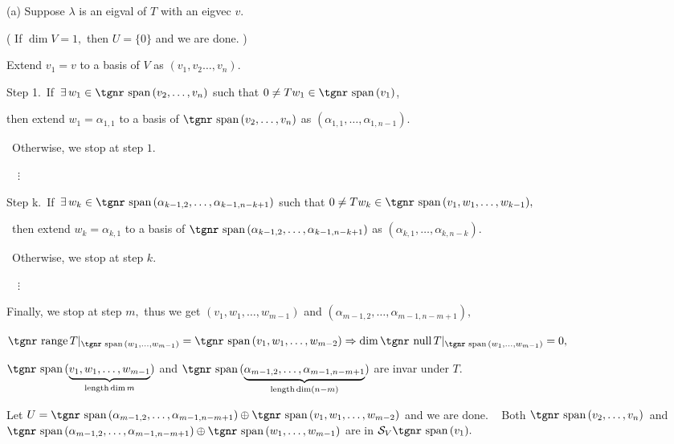 \documentclass[a4paper, 11pt, UTF8]{article}
\def\range{{\textup{\tgnr range}}\,}
\def\null{{\textup{\tgnr null}}\,}
\def\Spn{{\textup{\tgnr span}}\,}
\def\Ha{{\large\Blind{(a) }}}
\begin{document}
\begin{large}
(a) Suppose $\lambda$ is an eigval of $T$ with an eigvec $v.$\par\quad\Ha
( If $\dim V=1,$ then $U=\{0\}$ and we are done. )\par\quad\Ha
Extend $v_1=v$ to a basis of $V$ as $(v_1,v_2\dots,v_n).$\par\quad\Ha
{\tgbfx Step 1.} $\,$If $\,\exists\,w_1\in\Spn(v_2,\dots,v_n)$ such that $0\neq Tw_1\in\Spn(v_1)$,\par\qquad\Ha\qquad
then extend $w_1=\alpha_{1,1}$ to a basis of $\Spn(v_2,\dots,v_n)$ as $(\alpha_{1,1},\dots,\alpha_{1,n-1}).$\par\qquad\qquad\quad\, Otherwise, we stop at step $1.$\par\quad\Ha
$\quad\vdots$\par\quad\Ha
{\tgbfx Step k.} $\,$If $\,\exists\,w_k\in\Spn(\alpha_{k-1,2},\dots,\alpha_{k-1,n-k+1})$ such that $0\neq Tw_k\in\Spn(v_1,w_1,\dots,w_{k-1}),$\par\qquad\qquad\quad\,
then extend $w_k=\alpha_{k,1}$ to a basis of $\Spn(\alpha_{k-1,2},\dots,\alpha_{k-1,n-k+1})$ as $(\alpha_{k,1},\dots,\alpha_{k,n-k}).$\par\qquad\qquad\quad\,
Otherwise, we stop at step $k.$\par\quad\Ha
$\quad\vdots$\par\quad\Ha
Finally, we stop at step $m,$ thus we get $(v_1,w_1,\dots,w_{m-1})$ and $(\alpha_{m-1,2},\dots,\alpha_{m-1,n-m+1}),$\par\quad\Ha
$\range T|_{\Spn(w_1,\dots,w_{m-1})}=\Spn(v_1,w_1,\dots,w_{m-2})\Rightarrow\dim\null T|_{\Spn(w_1,\dots,w_{m-1})}=0,$\par\quad\Ha
$\Spn(\underbrace{v_1,w_1,\dots,w_{m-1}}_{\TXT{length} \dim m})$ and $\Spn(\underbrace{\alpha_{m-1,2},\dots,\alpha_{m-1,n-m+1}}_{\TXT{length} \dim (n-m)})$ are invar under $T.$\par\quad\Ha
Let $U=\Spn(\alpha_{m-1,2},\dots,\alpha_{m-1,n-m+1})\oplus\Spn(v_1,w_1,\dots,w_{m-2})$ and we are done.\PfEnd\quad\Ha
\Comment\,\,\, Both $\Spn(v_2,\dots,v_n)$ \,{\small and}\, $\Spn(\alpha_{m-1,2},\dots,\alpha_{m-1,n-m+1})\oplus\Spn(w_1,\dots,w_{m-1})$ are in $\mathcal{S}_V \Spn(v_1).$\par\vspace{6pt}\quad

\end{large}
\end{document}
